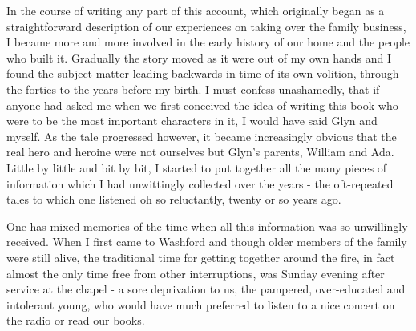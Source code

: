 
In the course of writing any part of this account, which originally began as a straightforward description of our experiences on taking over the family business, I became more and more involved in the early history of our home and the people who built it. Gradually the story moved as it were out of my own hands and I found the subject matter leading backwards in time of its own volition, through the forties to the years before my birth. I must confess unashamedly, that if anyone had asked me when we first conceived the idea of writing this book who were to be the most important characters in it, I would have said Glyn and myself. As the tale progressed however, it became increasingly obvious that the real hero and heroine were not ourselves but Glyn's parents, William and Ada. Little by little and bit by bit, I started to put together all the many pieces of information which I had unwittingly collected over the years - the oft-repeated tales to which one listened oh so reluctantly, twenty or so years ago.

One has mixed memories of the time when all this information was so unwillingly received. When I first came to Washford and though older members of the family were still alive, the traditional time for getting together around the fire, in fact almost the only time free from other interruptions, was Sunday evening after service at the chapel - a sore deprivation to us, the pampered, over-educated and intolerant young, who would have much preferred to listen to a nice concert on the radio or read our books.

